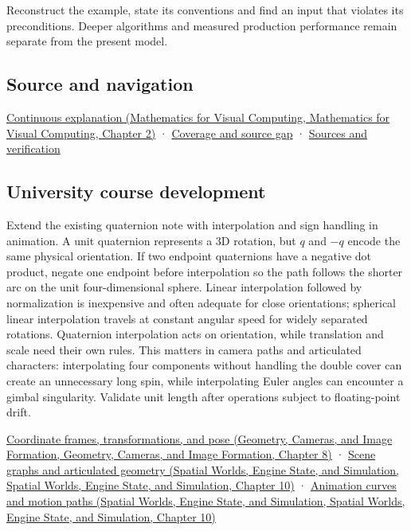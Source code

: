 Reconstruct the example, state its conventions and find an input that violates its preconditions. Deeper algorithms and measured production performance remain separate from the present model.

\subsection{Source and navigation}\label{appendix-8e61ab68f6b2-source-and-navigation}

\href{../02-Mathematics-for-Visual-Computing/main.pdf\#nameddest=01-foundations-i-ch018-keep-the-promises-visible-while-moving-between-representations}{Continuous explanation (Mathematics for Visual Computing, Mathematics for Visual Computing, Chapter 2)} · \hyperref[appendix-fd090d982a15-phase-7---parts-601-700]{Coverage and source gap} · \hyperref[appendix-a103e7846d21-phase-7---source-analysis-and-verification]{Sources and verification}

\subsection{University course development}\label{appendix-8e61ab68f6b2-university-course-development}

Extend the existing quaternion note with interpolation and sign handling in animation. A unit quaternion represents a 3D rotation, but \(q\) and \(-q\) encode the same physical orientation. If two endpoint quaternions have a negative dot product, negate one endpoint before interpolation so the path follows the shorter arc on the unit four-dimensional sphere. Linear interpolation followed by normalization is inexpensive and often adequate for close orientations; spherical linear interpolation travels at constant angular speed for widely separated rotations. Quaternion interpolation acts on orientation, while translation and scale need their own rules. This matters in camera paths and articulated characters: interpolating four components without handling the double cover can create an unnecessary long spin, while interpolating Euler angles can encounter a gimbal singularity. Validate unit length after operations subject to floating-point drift.

\href{../03-Geometry-Cameras-and-Image-Formation/main.pdf\#nameddest=03-visual-computing-i-ch001-coordinate-frames-transformations-and-pose}{Coordinate frames, transformations, and pose (Geometry, Cameras, and Image Formation, Geometry, Cameras, and Image Formation, Chapter 8)} · \href{../05-Spatial-Worlds-Engine-State-and-Simulation/main.pdf\#nameddest=04-visual-computing-ii-ch029-scene-graphs-and-articulated-geometry}{Scene graphs and articulated geometry (Spatial Worlds, Engine State, and Simulation, Spatial Worlds, Engine State, and Simulation, Chapter 10)} · \href{../05-Spatial-Worlds-Engine-State-and-Simulation/main.pdf\#nameddest=04-visual-computing-ii-ch029-animation-curves-and-motion-paths}{Animation curves and motion paths (Spatial Worlds, Engine State, and Simulation, Spatial Worlds, Engine State, and Simulation, Chapter 10)}
